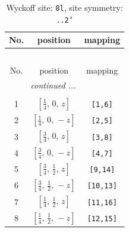 \documentclass[fleqn,8pt]{jsarticle}
\begin{document}
\begin{longtable}{ccc}
\caption{Wyckoff site: {\tt 8l}, site symmetry: {\tt ..2'}}
 \\
 \hline \hline
No. & position & mapping \\ \hline \endfirsthead

\multicolumn{2}{l}{\tablename\ \thetable{}} \\
 \hline \hline
No. & position & mapping \\ \hline \endhead

 \hline \hline
\multicolumn{2}{r}{\footnotesize\it continued ...} \\ \endfoot

 \hline \hline
\multicolumn{2}{r}{} \\ \endlastfoot

1 & $\left[ \frac{1}{4},\, 0,\, z \right]$ & {\tt [1,6]} \\ \hline
2 & $\left[ \frac{1}{4},\, 0,\, - z \right]$ & {\tt [2,5]} \\ \hline
3 & $\left[ \frac{3}{4},\, 0,\, z \right]$ & {\tt [3,8]} \\ \hline
4 & $\left[ \frac{3}{4},\, 0,\, - z \right]$ & {\tt [4,7]} \\ \hline
5 & $\left[ \frac{3}{4},\, \frac{1}{2},\, z \right]$ & {\tt [9,14]} \\ \hline
6 & $\left[ \frac{3}{4},\, \frac{1}{2},\, - z \right]$ & {\tt [10,13]} \\ \hline
7 & $\left[ \frac{1}{4},\, \frac{1}{2},\, z \right]$ & {\tt [11,16]} \\ \hline
8 & $\left[ \frac{1}{4},\, \frac{1}{2},\, - z \right]$ & {\tt [12,15]} \\
\end{longtable}
\renewcommand{\arraystretch}{1.2}
\end{document}
